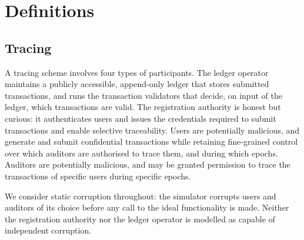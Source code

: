 \section{Definitions}\label{sec:txid-definitions}

\subsection{Tracing}

A tracing scheme involves four types of participants. The ledger operator
maintains a publicly accessible, append-only ledger that stores submitted
transactions, and runs the transaction validators that decide, on input of the
ledger, which transactions are valid. The registration authority is honest but
curious: it authenticates users and issues the credentials required to submit
transactions and enable selective traceability. Users are potentially
malicious, and generate and submit confidential transactions while retaining
fine-grained control over which auditors are authorised to trace them, and
during which epochs. Auditors are potentially malicious, and may be granted
permission to trace the transactions of specific users during specific epochs.

We consider static corruption throughout: the simulator corrupts users and
auditors of its choice before any call to the ideal functionality is made.
Neither the registration authority nor the ledger operator is modelled as
capable of independent corruption.

